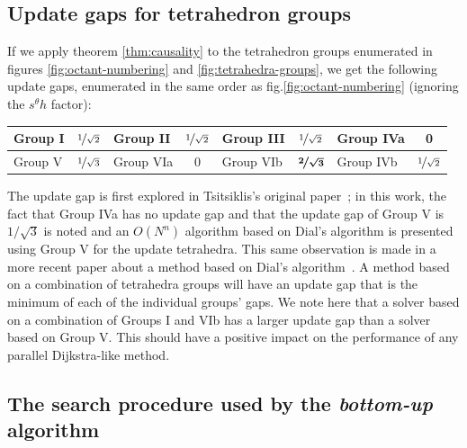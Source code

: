 \documentclass[smallcondensed]{svjour3}
\begin{document}
\subsection{Update gaps for tetrahedron
  groups}\label{ssec:update-gaps}

If we apply theorem \ref{thm:causality} to the tetrahedron groups
enumerated in figures \ref{fig:octant-numbering} and
\ref{fig:tetrahedra-groups}, we get the following update gaps,
enumerated in the same order as fig.\@ \ref{fig:octant-numbering}
(ignoring the $s^\theta h$ factor): \vspace{0.5em}
\begin{center}
  \begin{tabular}{lc|lc|lc|lc}
    Group I & $\nicefrac{1}{\sqrt{2}}$ & Group II & $\nicefrac{1}{\sqrt{2}}$ & Group III & $\nicefrac{1}{\sqrt{2}}$ & Group IVa & 0 \\
    \midrule
    Group V & $\nicefrac{1}{\sqrt{3}}$ & Group VIa & 0 & Group VIb & $\boldsymbol{\nicefrac{2}{\sqrt{3}}}$ & Group IVb & $\nicefrac{1}{\sqrt{2}}$
  \end{tabular}
\end{center}
\vspace{0.5em} The update gap is first explored in Tsitsiklis's
original paper~\cite{tsitsiklis1995efficient}; in this work, the fact
that Group IVa has no update gap and that the update gap of Group V is
$1/\sqrt{3}$ is noted and an $O(N^n)$ algorithm based on Dial's
algorithm is presented using Group V for the update tetrahedra. This
same observation is made in a more recent paper about a method based
on Dial's algorithm~\cite{kim2001calo}. A method based on a
combination of tetrahedra groups will have an update gap that is the
minimum of each of the individual groups' gaps. We note here that a
solver based on a combination of Groups I and VIb has a larger update
gap than a solver based on Group V. This should have a positive impact
on the performance of any parallel Dijkstra-like method.

\subsection{The search procedure used by the \emph{bottom-up}
  algorithm}\label{ssec:bottom-up-search}
\end{document}
